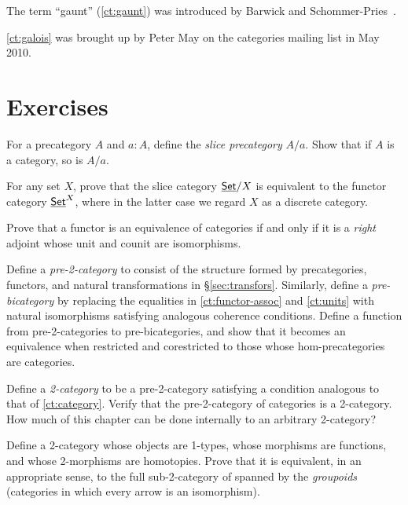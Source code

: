 The term ``gaunt'' (\autoref{ct:gaunt}) was introduced by Barwick and Schommer-Pries~\cite{bsp12infncats}.

\autoref{ct:galois} was brought up by Peter May on the categories mailing list in May 2010.


\section*{Exercises}
\label{sec:ct:exercises}

\begin{ex}
  For a precategory $A$ and $a:A$, define the \emph{slice precategory} $A/a$.
  Show that if $A$ is a category, so is $A/a$.
\end{ex}

\begin{ex}
  For any set $X$, prove that the slice category $\underline{\mathsf{Set}}/X$ is equivalent to the functor category $\underline{\mathsf{Set}}^X$, where in the latter case we regard $X$ as a discrete category.
\end{ex}

\begin{ex}
  Prove that a functor is an equivalence of categories if and only if it is a \emph{right} adjoint whose unit and counit are isomorphisms.
\end{ex}

\begin{ex}\label{ct:pre2cat}
  Define a \emph{pre-2-category} to consist of the structure formed by precategories, functors, and natural transformations in \S\ref{sec:transfors}.
  Similarly, define a \emph{pre-bicategory} by replacing the equalities in \autoref{ct:functor-assoc} and \autoref{ct:units} with natural isomorphisms satisfying analogous coherence conditions.
  Define a function from pre-2-categories to pre-bicategories, and show that it becomes an equivalence when restricted and corestricted to those whose hom-precategories are categories.
\end{ex}

\begin{ex}\label{ct:2cat}
  Define a \emph{2-category} to be a pre-2-category satisfying a condition analogous to that of \autoref{ct:category}.
  Verify that the pre-2-category of categories \ucat is a 2-category.
  How much of this chapter can be done internally to an arbitrary 2-category?
\end{ex}

\begin{ex}\label{ct:groupoids}
  Define a 2-category whose objects are 1-types, whose morphisms are functions, and whose 2-morphisms are homotopies.
  Prove that it is equivalent, in an appropriate sense, to the full sub-2-category of \ucat spanned by the \emph{groupoids} (categories in which every arrow is an isomorphism).
\end{ex}

